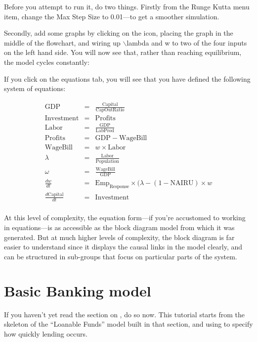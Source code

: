 Before you attempt to run it, do two things. Firstly from the Runge
Kutta menu item, change the Max Step Size to 0.01---to get a smoother
simulation. 


Secondly, add some graphs by clicking on the
 icon, placing the graph
in the middle of the flowchart, and wiring up $\backslash$lambda and w to two of
the four inputs on the left hand side. You will now see that, rather
than reaching equilibrium, the model cycles constantly:


If you click on the equations tab, you will see that you have defined the following system of
equations:

\begin{eqnarray*}
\mathrm{GDP}&=&\frac{\mathrm{Capital}}{\mathrm{CapOutRatio}}\\
\mathrm{Investment}&=&\mathrm{Profits}\\
\mathrm{Labor}&=&\frac{\mathrm{GDP}}{\mathrm{LabProd}}\\
\mathrm{Profits}&=&\mathrm{GDP}-\mathrm{WageBill}\\
\mathrm{WageBill}&=&w\times\mathrm{Labor}\\
\lambda&=&\frac{\mathrm{Labor}}{\mathrm{Population}}\\
\omega&=&\frac{\mathrm{WageBill}}{\mathrm{GDP}}\\
\frac{dw}{dt}&=&\mathrm{Emp}_\mathrm{Response}\times(\lambda-(1-\mathrm{NAIRU})
        \times w\\
\frac{d\mathrm{Capital}}{dt}&=&\mathrm{Investment}\\
\end{eqnarray*}


At this level of complexity, the equation form---if you're accustomed
to working in equations---is as accessible as the block diagram model from
which it was generated. But at much higher levels of complexity, the
block diagram is far easier to understand since it displays the causal
links in the model clearly, and can be structured in sub-groups that
focus on particular parts of the system. 

\section{Basic Banking model}\label{tut:basicBankModel}

If you haven't yet read the section on , do so now. This tutorial starts from the
skeleton of the ``Loanable Funds'' model built in that section, and
using  to specify how quickly
lending occurs.  


